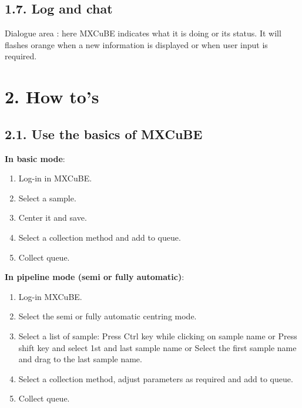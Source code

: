 \documentclass[a4paper,10pt,english]{sphinxmanual}
\begin{document}
\section{1.7. Log and chat}
\label{user_manual:logging-chat}\label{user_manual:log-and-chat}
Dialogue area : here MXCuBE indicates what it is doing or its status. It will flashes orange when a new information is displayed or when user input is required.


\chapter{2. How to's}
\label{user_manual:howto}\label{user_manual:how-to-s}

\section{2.1. Use the basics of MXCuBE}
\label{user_manual:use-the-basics-of-mxcube}
\textbf{In basic mode}:
\begin{enumerate}
\item {} 
Log-in in MXCuBE.

\item {} 
Select a sample.

\item {} 
Center it and save.

\item {} 
Select a collection method and add to queue.

\item {} 
Collect queue.

\end{enumerate}

\textbf{In pipeline mode (semi or fully automatic)}:
\begin{enumerate}
\item {} 
Log-in MXCuBE.

\item {} 
Select the semi or fully automatic centring mode.

\item {} 
Select a list of sample: Press Ctrl key while clicking on sample name or Press shift key and select 1st and last sample name or Select the first sample name and drag to the last sample name.

\item {} 
Select a collection method, adjust parameters as required and add to queue.

\item {} 
Collect queue.

\end{enumerate}
\end{document}
